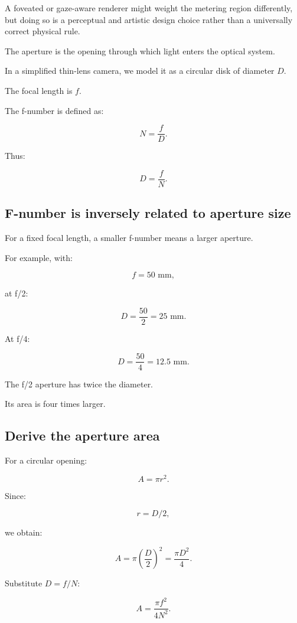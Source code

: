A foveated or gaze-aware renderer might weight the metering region differently, but doing so is a perceptual and artistic design choice rather than a universally correct physical rule.

The aperture is the opening through which light enters the optical system.

In a simplified thin-lens camera, we model it as a circular disk of diameter \(D\).

The focal length is \(f\).

The f-number is defined as:

\[ \boxed{ N=\frac fD. } \]

Thus:

\[ \boxed{ D=\frac fN. } \]

\subsection{F-number is inversely related to aperture size}\label{02-foundations-ii-ch036-f-number-is-inversely-related-to-aperture-size}

For a fixed focal length, a smaller f-number means a larger aperture.

For example, with:

\[ f=50\text{ mm}, \]

at f/2:

\[ D=\frac{50}{2}=\boxed{25\text{ mm}}. \]

At f/4:

\[ D=\frac{50}{4}=\boxed{12.5\text{ mm}}. \]

The f/2 aperture has twice the diameter.

Its area is four times larger.

\subsection{Derive the aperture area}\label{02-foundations-ii-ch036-derive-the-aperture-area}

For a circular opening:

\[ A=\pi r^2. \]

Since:

\[ r=D/2, \]

we obtain:

\[ \boxed{ A=\pi\left(\frac D2\right)^2 =\frac{\pi D^2}{4}. } \]

Substitute \(D=f/N\):

\[ \boxed{ A=\frac{\pi f^2}{4N^2}. } \]

